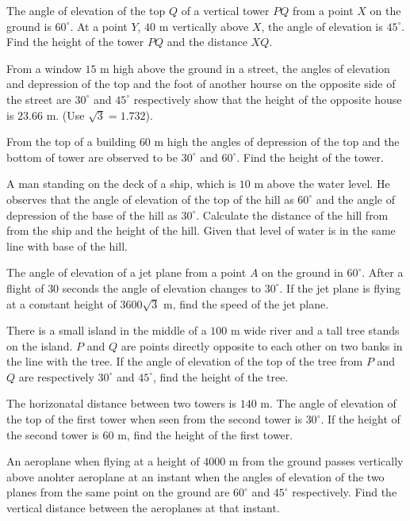 \item The angle of elevation of the top $Q$ of a vertical tower $PQ$ from a point $X$ on the ground is
  $60^\circ$. At a point $Y$, $40$ m vertically above $X$, the angle of elevation is
  $45^\circ$. Find the height of the tower $PQ$ and the distance $XQ$.

\item From a window $15$ m high above the ground in a street, the angles of elevation and depression of the top and the foot of
  another hourse on the opposite side of the street are $30^\circ$ and $45^\circ$ respectively show that the height
  of the opposite house is $23.66$ m. (Use $\sqrt{3} = 1.732$).

\item From the top of a building $60$ m high the angles of depression of the top and the bottom of tower are observed to be
  $30^\circ$ and $60^\circ$. Find the height of the tower.

\item A man standing on the deck of a ship, which is $10$ m above the water level. He observes that the angle of elevation of
  the top of the hill as $60^\circ$ and the angle of depression of the base of the hill as $30^\circ$. Calculate the
  distance of the hill from from the ship and the height of the hill. Given that level of water is in the same line with base
  of the hill.

\item The angle of elevation of a jet plane from a point $A$ on the ground in $60^\circ$. After a flight of $30$
  seconds the angle of elevation changes to $30^\circ$. If the jet plane is flying at a constant height of
  $3600\sqrt{3}$ m, find the speed of the jet plane.

\item There is a small island in the middle of a $100$ m wide river and a tall tree stands on the island. $P$ and
  $Q$ are points directly opposite to each other on two banks in the line with the tree. If the angle of elevation of the
  top of the tree from $P$ and $Q$ are respectively $30^\circ$ and $45^\circ$, find the height of the
  tree.

\item The horizonatal distance between two towers is $140$ m. The angle of elevation of the top  of the first tower when seen
  from the second tower is $30^\circ$. If the height of the second tower is $60$ m, find the height of the first
  tower.

\item An aeroplane when flying at a height of $4000$ m from the ground passes vertically above anohter aeroplane at an instant
  when the angles of elevation of the two planes from the same point on the ground are $60^\circ$ and $45^\circ$
  respectively. Find the vertical distance between the aeroplanes at that instant.

